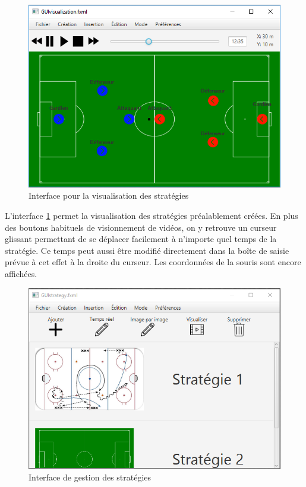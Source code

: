 \begin{figure}[htpb]
    \centering
    \includegraphics[scale=0.6]{fig/gui/gui_visualisation.png}
    \caption{Interface pour la visualisation des stratégies}
    \label{fig:gui:gui_visualisation}
\end{figure}

L'interface \ref{fig:gui:gui_visualisation} permet la visualisation des stratégies préalablement créées.
En plus des boutons habituels de visionnement de vidéos, on y retrouve un curseur glissant permettant de se déplacer facilement à n'importe quel temps de la stratégie.
Ce temps peut aussi être modifié directement dans la boîte de saisie prévue à cet effet à la droite du curseur.
Les coordonnées de la souris sont encore affichées.

\begin{figure}[htpb]
    \centering
    \includegraphics[scale=0.6]{fig/gui/gui_strategie.png}
    \caption{Interface de gestion des stratégies}
    \label{fig:gui:gui_strategie}
\end{figure}

